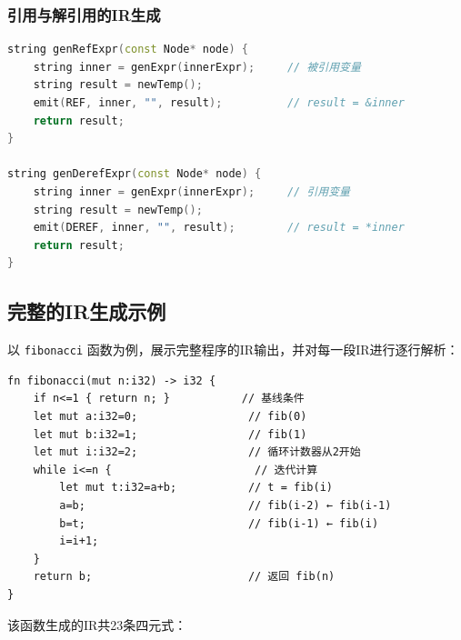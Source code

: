 \documentclass[12pt,a4paper]{ctexart}
\begin{document}
\subsubsection{引用与解引用的IR生成}

\begin{lstlisting}[language=C++, caption={引用与解引用的IR生成}]
string genRefExpr(const Node* node) {
    string inner = genExpr(innerExpr);     // 被引用变量
    string result = newTemp();
    emit(REF, inner, "", result);          // result = &inner
    return result;
}

string genDerefExpr(const Node* node) {
    string inner = genExpr(innerExpr);     // 引用变量
    string result = newTemp();
    emit(DEREF, inner, "", result);        // result = *inner
    return result;
}
\end{lstlisting}

\subsection{完整的IR生成示例}

以 \texttt{fibonacci} 函数为例，展示完整程序的IR输出，并对每一段IR进行逐行解析：

\begin{lstlisting}[language=RustLike, caption={fibonacci函数源码（13行有效代码）}]
fn fibonacci(mut n:i32) -> i32 {
    if n<=1 { return n; }           // 基线条件
    let mut a:i32=0;                 // fib(0)
    let mut b:i32=1;                 // fib(1)
    let mut i:i32=2;                 // 循环计数器从2开始
    while i<=n {                      // 迭代计算
        let mut t:i32=a+b;           // t = fib(i)
        a=b;                         // fib(i-2) ← fib(i-1)
        b=t;                         // fib(i-1) ← fib(i)
        i=i+1;
    }
    return b;                        // 返回 fib(n)
}
\end{lstlisting}

该函数生成的IR共23条四元式：
\end{document}
